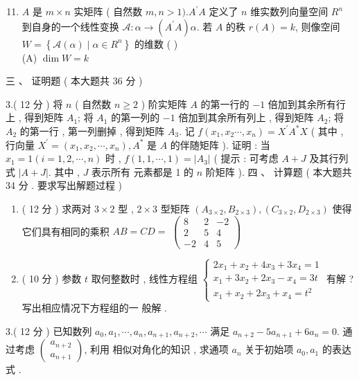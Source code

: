 \documentclass[10pt]{article}
\begin{document}
{\begin{enumerate}
  \setcounter{enumi}{10}
  \item $A$  是  $m \times n$  实矩阵 ( 自然数  $m, n>1) . A^{\prime} A$  定义了  $n$  维实数列向量空间  $R^{n}$  到自身的一个线性变换  $\mathscr{A}: \alpha \rightarrow\left(A^{\prime} A\right) \alpha$.  若  $A$  的秩  $r(A)=k$,  则像空间  $W=\left\{\mathscr{A}(\alpha) \mid \alpha \in R^{n}\right\}$  的维数  ( )\\
(A) $\operatorname{dim} W=k$
\end{enumerate}
 三 、 证明题 ( 本大题共  36  分 )

3.( 12  分 )  将  $n$ ( 自然数  $n \geq 2$ )  阶实矩阵  $A$  的第一行的  $-1$  倍加到其余所有行上 ,  得到矩阵  $A_{1}$;  将  $A_{1}$  的第一列的  $-1$  倍加到其余所有列上 ,  得到矩阵  $A_{2}$;  将  $A_{2}$  的第一行 ,  第一列删掉 ,  得到矩阵  $A_{3}$.  记  $f\left(x_{1}, x_{2} \cdots, x_{n}\right)=X^{\prime} A^{*} X$ ( 其中 ,  行向量  $X^{\prime}=\left(x_{1}, x_{2}, \cdots, x_{n}\right), A^{*}$  是  $A$  的伴随矩阵 ).  证明 :  当  $x_{1}=1(i=1,2, \cdots, n)$  时 , $f(1,1, \cdots, 1)=\left|A_{3}\right|$ ( 提示 :  可考虑  $A+J$  及其行列式  $|A+J|$.  其中 , $J$  表示所有   元素都是  1  的  $n$  阶矩阵 ).  四 、 计算题 ( 本大题共  34  分 .  要求写出解题过程 )

\begin{enumerate}
  \item ( 12  分 )  求两对  $3 \times 2$  型 , $2 \times 3$  型矩阵  $\left(A_{3 \times 2}, B_{2 \times 3}\right),\left(C_{3 \times 2}, D_{2 \times 3}\right)$  使得它们具有相同的乘积  $A B=C D=$ $\left(\begin{array}{ccc}8 & 2 & -2 \\ 2 & 5 & 4 \\ -2 & 4 & 5\end{array}\right)$

  \item ( 10  分 )  参数  $t$  取何整数时 ,  线性方程组  $\left\{\begin{array}{c}2 x_{1}+x_{2}+4 x_{3}+3 x_{4}=1 \\ x_{1}+3 x_{2}+2 x_{3}-x_{4}=3 t \\ x_{1}+x_{2}+2 x_{3}+x_{4}=t^{2}\end{array}\right.$  有解 ?  写出相应情况下方程组的一   般解 .

\end{enumerate}
3.( 12  分 )  已知数列  $a_{0}, a_{1}, \cdots, a_{n}, a_{n+1}, a_{n+2}, \cdots$  满足  $a_{n+2}-5 a_{n+1}+6 a_{n}=0$.  通过考虑  $\left(\begin{array}{c}a_{n+2} \\ a_{n+1}\end{array}\right)$,  利用   相似对角化的知识 ,  求通项  $a_{n}$  关于初始项  $a_{0}, a_{1}$  的表达式 .

}
\end{document}
